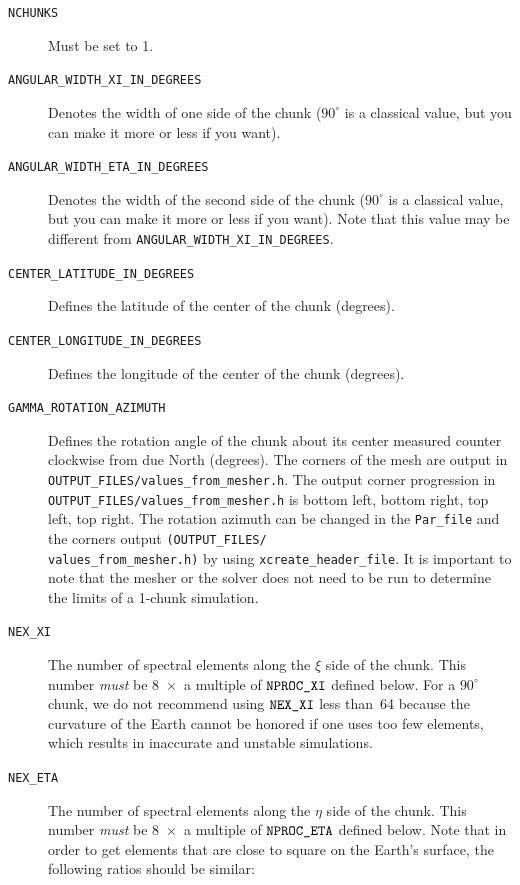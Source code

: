 \begin{description}
\item [{\texttt{NCHUNKS}}] Must be set to 1.
%
\item [{\texttt{ANGULAR\_WIDTH\_XI\_IN\_DEGREES}}] Denotes the width of
one side of the chunk ($90^{\circ}$ is a classical value, but you can make it more or less if you want).
%
\item [{\texttt{ANGULAR\_WIDTH\_ETA\_IN\_DEGREES}}] Denotes the width of
the second side of the chunk ($90^{\circ}$ is a classical value, but you can make it more or less if you want). Note that this
value may be different from \texttt{ANGULAR\_WIDTH\_XI\_IN\_DEGREES}.
%
\item [{\texttt{CENTER\_LATITUDE\_IN\_DEGREES}}] Defines the latitude of
the center of the chunk (degrees).
%
\item [{\texttt{CENTER\_LONGITUDE\_IN\_DEGREES}}] Defines the longitude
of the center of the chunk (degrees).
%
\item [{\texttt{GAMMA\_ROTATION\_AZIMUTH}}] Defines the rotation angle
of the chunk about its center measured counter clockwise from due
North (degrees). The corners of the mesh are output in \texttt{\small OUTPUT\_FILES/values\_from\_mesher.h}.
The output corner progression in \texttt{\small OUTPUT\_FILES/values\_from\_mesher.h}
is bottom left, bottom right, top left, top right. The rotation azimuth
can be changed in the \texttt{Par\_file} and the corners output \texttt{(}\texttt{\small OUTPUT\_FILES/}~\\
\texttt{\small values\_from\_mesher.h}\texttt{)} by using{\small{}
}\texttt{\small xcreate\_header\_file}. It is important to note that
the mesher or the solver does not need to be run to determine the
limits of a 1-chunk simulation.
%
\item [{\texttt{NEX\_XI}}] The number of spectral elements along the $\xi$ side
of the chunk. This number \textit{must} be 8~$\times$~a multiple
of $\mbox{\texttt{NPROC\_XI}}$ defined below. For a $90^{\circ}$ chunk, we do not
recommend using $\mbox{\texttt{NEX\_XI}}$ less than~64 because the curvature of the
Earth cannot be honored if one uses too few elements, which results
in inaccurate and unstable simulations.
%
\item [{\texttt{NEX\_ETA}}] The number of spectral elements along the $\eta$
side of the chunk. This number \textit{must} be 8~$\times$~a multiple
of $\mbox{\texttt{NPROC\_ETA}}$ defined below. Note that in order to get elements
that are close to square on the Earth's surface, the following ratios
should be similar:
\begin{verbatim}

\end{verbatim}
\end{description}

